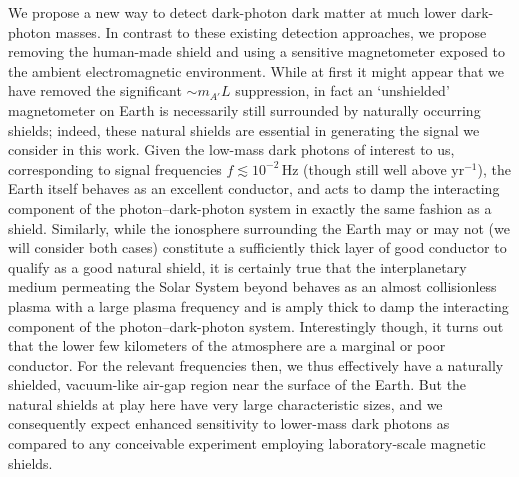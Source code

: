 \documentclass[amsmath,amssymb,aps,10pt,prd,letterpaper,nofootinbib,balancelastpage,notitlepage,superscriptaddress,twocolumn,floatfix]{revtex4-2}
\begin{document}
We propose a new way to detect dark-photon dark matter at much lower dark-photon masses.
In contrast to these existing detection approaches, we propose removing the human-made shield and using a sensitive magnetometer exposed to the ambient electromagnetic environment.
While at first it might appear that we have removed the significant $\sim m_{A'} L$ suppression, in fact an `unshielded' magnetometer on Earth is necessarily still surrounded by naturally occurring shields; indeed, these natural shields are essential in generating the signal we consider in this work.
Given the low-mass dark photons of interest to us, corresponding to signal frequencies $f \lesssim  10^{-2}\,$Hz (though still well above $\text{yr}^{-1}$), the Earth itself behaves as an excellent conductor, and acts to damp the interacting component of the photon--dark-photon system in exactly the same fashion as a shield.
Similarly, while the ionosphere surrounding the Earth may or may not (we will consider both cases) constitute a sufficiently thick layer of good conductor to qualify as a good natural shield, it is certainly true that the interplanetary medium permeating the Solar System beyond behaves as an almost collisionless plasma with a large plasma frequency and is amply thick to damp the interacting component of the photon--dark-photon system.
Interestingly though, it turns out that the lower few kilometers of the atmosphere are a marginal or poor conductor.
For the relevant frequencies then, we thus effectively have a naturally shielded, vacuum-like air-gap region near the surface of the Earth.
But the natural shields at play here have very large characteristic sizes, and we consequently expect enhanced sensitivity to lower-mass dark photons as compared to any conceivable experiment employing laboratory-scale magnetic shields.
\end{document}
